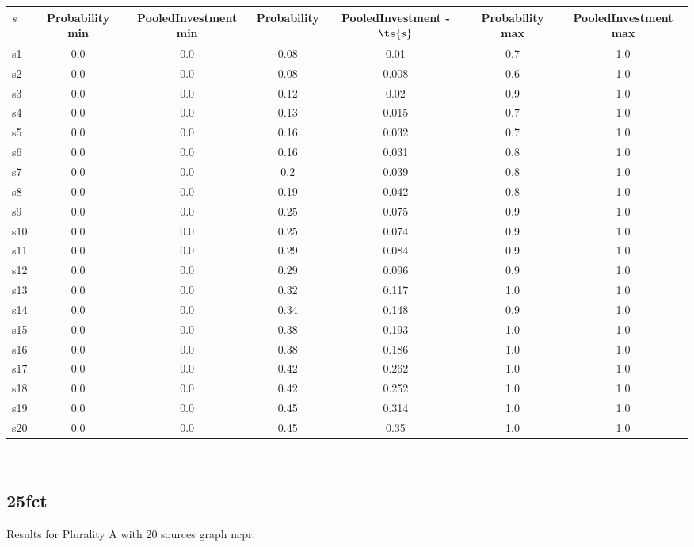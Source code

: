 \documentclass{article}
\begin{document}
\noindent\begin{tabular}{|l|c|c|c|c|c|c|}
\hline
$s$& Probability min & PooledInvestment min & Probability & PooledInvestment - $\ts{s}$ & Probability max & PooledInvestment max\\
\hline
s1 &0.0 & 0.0 & 0.08 & 0.01 & 0.7 & 1.0\\
\hline
s2 &0.0 & 0.0 & 0.08 & 0.008 & 0.6 & 1.0\\
\hline
s3 &0.0 & 0.0 & 0.12 & 0.02 & 0.9 & 1.0\\
\hline
s4 &0.0 & 0.0 & 0.13 & 0.015 & 0.7 & 1.0\\
\hline
s5 &0.0 & 0.0 & 0.16 & 0.032 & 0.7 & 1.0\\
\hline
s6 &0.0 & 0.0 & 0.16 & 0.031 & 0.8 & 1.0\\
\hline
s7 &0.0 & 0.0 & 0.2 & 0.039 & 0.8 & 1.0\\
\hline
s8 &0.0 & 0.0 & 0.19 & 0.042 & 0.8 & 1.0\\
\hline
s9 &0.0 & 0.0 & 0.25 & 0.075 & 0.9 & 1.0\\
\hline
s10 &0.0 & 0.0 & 0.25 & 0.074 & 0.9 & 1.0\\
\hline
s11 &0.0 & 0.0 & 0.29 & 0.084 & 0.9 & 1.0\\
\hline
s12 &0.0 & 0.0 & 0.29 & 0.096 & 0.9 & 1.0\\
\hline
s13 &0.0 & 0.0 & 0.32 & 0.117 & 1.0 & 1.0\\
\hline
s14 &0.0 & 0.0 & 0.34 & 0.148 & 0.9 & 1.0\\
\hline
s15 &0.0 & 0.0 & 0.38 & 0.193 & 1.0 & 1.0\\
\hline
s16 &0.0 & 0.0 & 0.38 & 0.186 & 1.0 & 1.0\\
\hline
s17 &0.0 & 0.0 & 0.42 & 0.262 & 1.0 & 1.0\\
\hline
s18 &0.0 & 0.0 & 0.42 & 0.252 & 1.0 & 1.0\\
\hline
s19 &0.0 & 0.0 & 0.45 & 0.314 & 1.0 & 1.0\\
\hline
s20 &0.0 & 0.0 & 0.45 & 0.35 & 1.0 & 1.0\\
\hline
\end{tabular}\\

\newpage

\subsection{25fct}

\noindent Results for Plurality A with 20 sources graph ncpr.
\end{document}
